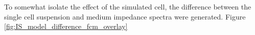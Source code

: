 

\par To somewhat isolate the effect of the simulated cell, the difference between the single cell suspension and medium impedance spectra were generated. Figure \ref{fig:IS_model_difference_fcm_overlay}

